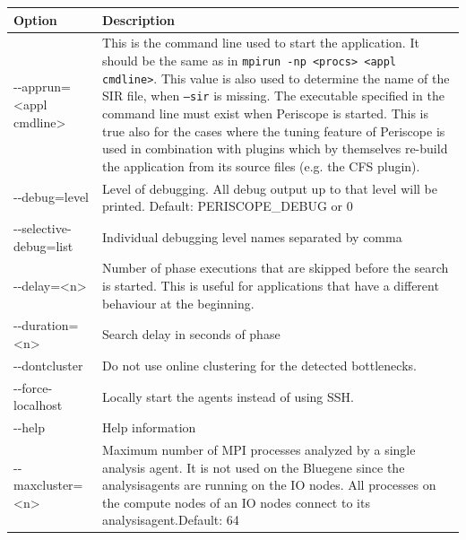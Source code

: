 \documentclass[11pt,oneside,a4paper]{book}
\begin{document}
\begin{center}
 \label{table:frontend-options}
 \begin{longtable}{|p{5cm}|p{7cm}|}
  \hline
  Option & Description \\
  \hline
  -{}-apprun=\textless appl cmdline\textgreater &
  This is the command line used to start the application. It should be the same as in \texttt{mpirun -np <procs> <appl cmdline>}.\newline\newline
  This value is also used to determine the name of the SIR file, when \texttt{--sir} is missing.\newline\newline
   The executable specified in the command line must exist when Periscope is started. This is true also for the cases where the tuning feature of Periscope is used in combination with plugins which by themselves re-build the application from its source files (e.g. the CFS plugin).\\
  \hline

  -{}-debug=level &
  Level of debugging. All debug output up to that level will be printed.\newline
Default: PERISCOPE\_DEBUG or 0 \\
  \hline

  -{}-selective-debug=list &
  Individual debugging level names separated by comma\\
  \hline

  -{}-delay=\textless n\textgreater &
  Number of phase executions that are skipped before the search is started. This is useful for applications that have a different behaviour at the beginning. \\
  \hline

   -{}-duration=\textless n\textgreater &
 Search delay in seconds of phase\\
  \hline

  -{}-dontcluster &
  Do not use online clustering for the detected bottlenecks.\\
  \hline

  -{}-force-localhost &
  Locally start the agents instead of using SSH. \\
  \hline

  -{}-help &
  Help information \\
  \hline

  -{}-maxcluster=\textless n\textgreater &
  Maximum number of MPI processes analyzed by a single analysis agent.\newline\newline
  It is not used on the Bluegene since the analysisagents are running on the IO nodes. All processes on the compute nodes of an IO nodes connect to its analysisagent.\newline\newline Default: 64 \\
  \hline


\end{longtable}
\end{center}
\end{document}
